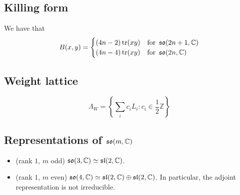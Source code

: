\documentclass{report}
\begin{document}
\subsection{Killing form}
We have that 
\[
B(x,y) = \begin{cases}
    (4n-2)\operatorname{tr}(xy) & \text{for } \operatorname{{\mathfrak{so}}}(2n+1, \mathbb C)\\
    (4n-4)\operatorname{tr}(xy) & \text{for } \operatorname{{\mathfrak{so}}}(2n, \mathbb C)
\end{cases}
\]
\subsection{Weight lattice}
\[
\Lambda_W = \left\{ \sum_i c_i L_i : c_i \in \frac{1}{2}\mathbb Z \right\}
\]
\subsection{Representations of $\operatorname{{\mathfrak{so}}}(m, \mathbb C)$}
\begin{itemize}
    \item (rank $1$, $m$ odd) $\operatorname{{\mathfrak{so}}}(3, \mathbb C) \simeq \operatorname{{\mathfrak{sl}}}(2, \mathbb C)$.
    \item (rank $1$, $m$ even) $\operatorname{{\mathfrak{so}}}(4, \mathbb C) \simeq \operatorname{{\mathfrak{sl}}}(2, \mathbb C) \oplus \operatorname{{\mathfrak{sl}}}(2,\mathbb C)$. In particular, the adjoint representation is not irreducible.
\end{itemize}
\end{document}
